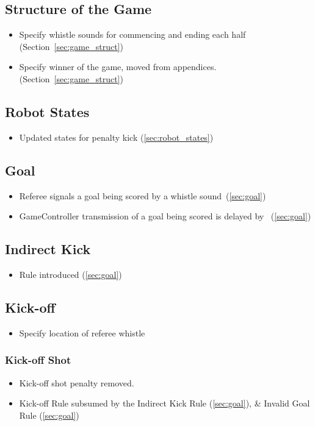 \subsection*{Structure of the Game}
\begin{itemize}
  \item Specify whistle sounds for commencing and ending each half (\cf Section~\ref{sec:game_struct})
  \item Specify winner of the game, moved from appendices. (\cf Section~\ref{sec:game_struct})
\end{itemize}

\subsection*{Robot States}
\begin{itemize}
  \item Updated states for penalty kick (\cf \cref{sec:robot_states})
\end{itemize}

\subsection*{Goal}
\begin{itemize}
  \item Referee signals a goal being scored by a whistle sound~(\cf \cref{sec:goal})
  \item GameController transmission of a goal being scored is delayed by \GoalScoredDelay~(\cf \cref{sec:goal})
\end{itemize}

\subsection*{Indirect Kick}
\begin{itemize}
  \item Rule introduced (\cf \cref{sec:goal})
\end{itemize}

\subsection*{Kick-off}
\begin{itemize}
  \item Specify location of referee whistle
\end{itemize}

\subsubsection*{Kick-off Shot}
\begin{itemize}
  \item Kick-off shot penalty removed.
  \item Kick-off Rule subsumed by the Indirect Kick Rule (\cf \cref{sec:goal}), \& Invalid Goal Rule (\cf \cref{sec:goal})
\end{itemize}

